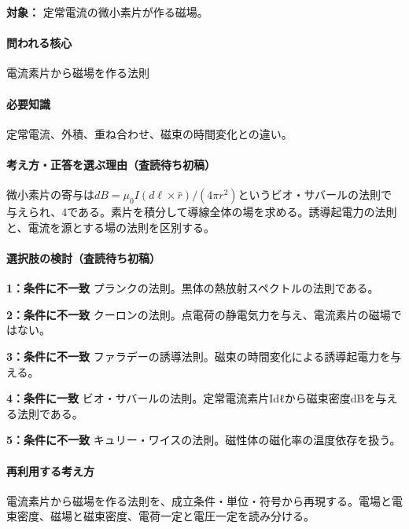 \noindent\textbf{対象：} 定常電流の微小素片が作る磁場。\par

\paragraph{問われる核心} 電流素片から磁場を作る法則

\paragraph{必要知識} 定常電流、外積、重ね合わせ、磁束の時間変化との違い。

\paragraph{考え方・正答を選ぶ理由（査読待ち初稿）} 微小素片の寄与は\(dB=\mu_0 I(d\ell\times\hat r)/(4\pi r^2)\)というビオ・サバールの法則で与えられ、4である。素片を積分して導線全体の場を求める。誘導起電力の法則と、電流を源とする場の法則を区別する。

\paragraph{選択肢の検討（査読待ち初稿）}\mbox{}\par

\noindent\textbf{1：条件に不一致} プランクの法則。黒体の熱放射スペクトルの法則である。\par

\noindent\textbf{2：条件に不一致} クーロンの法則。点電荷の静電気力を与え、電流素片の磁場ではない。\par

\noindent\textbf{3：条件に不一致} ファラデーの誘導法則。磁束の時間変化による誘導起電力を与える。\par

\noindent\textbf{4：条件に一致} ビオ・サバールの法則。定常電流素片Idℓから磁束密度dBを与える法則である。\par

\noindent\textbf{5：条件に不一致} キュリー・ワイスの法則。磁性体の磁化率の温度依存を扱う。\par

\paragraph{再利用する考え方} 電流素片から磁場を作る法則を、成立条件・単位・符号から再現する。電場と電束密度、磁場と磁束密度、電荷一定と電圧一定を読み分ける。

